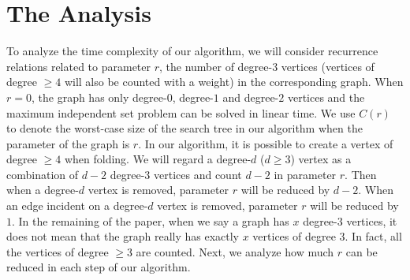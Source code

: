 \documentclass[runningheads]{llncs}
\begin{document}
 \section{The Analysis}
To analyze the time complexity of our algorithm, we will consider
recurrence relations related to parameter $r$, the number of
degree-$3$ vertices (vertices of degree $\geq 4$ will also be
counted with a weight) in the corresponding graph. When $r=0$, the
graph has only degree-$0$, degree-$1$ and degree-$2$ vertices and
the maximum independent set problem can be solved in linear time.
We use $C(r)$ to denote the worst-case size of the search tree in
our algorithm when the parameter of the graph is $r$. In our
algorithm, it is possible to create a vertex of degree $\geq 4$
when folding. We will regard a degree-$d$ ($d\geq3$) vertex as a
combination of $d-2$ degree-$3$ vertices and count $d-2$ in
parameter $r$. Then when a degree-$d$ vertex is removed, parameter
$r$ will be reduced by $d-2$. When an edge incident on a
degree-$d$ vertex is removed, parameter $r$ will be reduced by
$1$. In the remaining of the paper, when we say a graph has $x$
degree-$3$ vertices, it does not mean that the graph really has
exactly $x$ vertices of degree $3$. In fact, all the vertices of
degree $\geq3$ are counted. Next, we analyze how much $r$ can be
reduced in each step of our algorithm.




\end{document}
